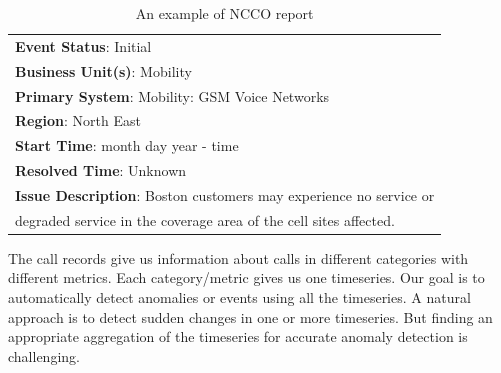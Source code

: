 \begin{table}
\centering
\begin{tabular}{|l|}
\hline
\textbf{Event Status}: Initial \\
\textbf{Business Unit(s)}: Mobility \\
\textbf{Primary System}: Mobility: GSM Voice Networks    \\     
\textbf{Region}: North East \\
\textbf{Start Time}: month day year - time  \\
\textbf{Resolved Time}: Unknown  \\
\textbf{Issue Description}: Boston customers may experience no service or \\
degraded service in the coverage area of the cell sites affected. \\ 
\hline
\end{tabular}
\caption{An example of NCCO report}
\label{tab:ncco-report}
\end{table}

 The call records give us information about
calls in different categories with different metrics. Each category/metric
gives us one timeseries. Our goal is to automatically detect anomalies or
events using all the timeseries. A natural approach is to detect
sudden changes in one or more timeseries. But finding an appropriate
aggregation of the timeseries for accurate anomaly detection is challenging.

